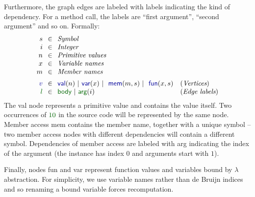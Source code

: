\documentclass[sigplan,10pt]{acmart}\settopmatter{printfolios=true,printccs=false,printacmref=false}
\theoremstyle{plain}
\theoremstyle{definition}
\newcommand{\num}[1]{\textcolor{numclr}{#1}}
\newcommand{\bndclr}[1]{\textcolor{kvdclr}{#1}}
\newcommand{\blblclr}[1]{\textcolor{numclr}{#1}}
\newcommand{\bnd}[1]{\textnormal{\textcolor{kvdclr}{\sffamily #1}}}
\newcommand{\blbl}[1]{\textnormal{\textcolor{numclr}{\sffamily #1}}}
\begin{document}
Furthermore, the graph edges are labeled with labels indicating the kind of dependency. For
a method call, the labels are ``first argument'', ``second argument'' and so on. Formally:
%
\begin{equation*}
\begin{array}{rcll}
s&\hspace{-0.25em}\in\hspace{-0.25em}& \textit{Symbol}\\
i&\hspace{-0.25em}\in\hspace{-0.25em}& \textit{Integer}\\
n&\hspace{-0.25em}\in\hspace{-0.25em}& \textit{Primitive values}\\
x&\hspace{-0.25em}\in\hspace{-0.25em}& \textit{Variable names}\\
m&\hspace{-0.25em}\in\hspace{-0.25em}& \textit{Member names}\\[0.5em]
\bndclr{v}&\hspace{-0.25em}\in\hspace{-0.25em}&\bnd{val}(n)~|~\bnd{var}(x)~|~\bnd{mem}(m, s)~|~\bnd{fun}(x, s)&(\textit{Vertices})\\
\blblclr{l}&\hspace{-0.25em}\in\hspace{-0.25em}&\blbl{body}~|~\blbl{arg}(i)&(\textit{Edge labels})\\
\end{array}
\end{equation*}
%
The \bnd{val} node represents a primitive value and contains the value itself. Two occurrences
of $\num{10}$ in the source code will be represented by the same node. Member access \bnd{mem}
contains the member name, together with a unique symbol -- two member access nodes with different 
dependencies will contain a different symbol. Dependencies of member access are labeled with 
\blbl{arg} indicating the index of the argument (the instance has index $0$ and arguments 
start with $1$).

Finally, nodes \bnd{fun} and \bnd{var} represent function values and variables bound by $\lambda$ 
abstraction. For simplicity, we use variable names rather than de Bruijn indices and so 
renaming a bound variable forces recomputation.
\end{document}
